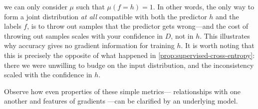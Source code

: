 \documentclass[twoside]{article}
\theoremstyle{plain}
\theoremstyle{definition}
\begin{document}
we can only consider $\mu$
such that $\mu(f \!=\! h) \!=\! 1$.
In other words, the only way to form a joint distribution \emph{at all} compatible with both the predictor $h$ and the labels $f$, is to throw out samples that the predictor gets wrong---and the cost of throwing out samples scales with your confidence in $D$, not in $h$.
This illustrates why accuracy gives no gradient information for training $h$.
It is worth noting that this is precisely
the opposite of what happened in \cref{prop:supervised-cross-entropy}: there we were unwilling to budge on the input distribution, and
the inconsistency scaled with the confidence in $h$.
%

Observe how even properties of these simple metrics---%
relationships with one another and features of gradients%
	---can be clarified by an underlying model.
\end{document}
